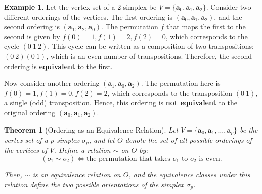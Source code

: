 \documentclass[12pt,oneside,reqno]{amsart}
\theoremstyle{plain}
\newtheorem{theorem}{Theorem}[section]
\theoremstyle{definition}
\newtheorem{example}{Example}[section]
\theoremstyle{remark}
\newcommand{\0}{{\textbf{0}}}
\begin{document}
\begin{example}\label{eg:Equivalence of Ordering of Vertices}
Let the vertex set of a 2-simplex be \( V = \{\mathbf{a}_0, \mathbf{a}_1, \mathbf{a}_2\} \). Consider two different orderings of the vertices. The first ordering is \( (\mathbf{a}_0, \mathbf{a}_1, \mathbf{a}_2) \), and the second ordering is \( (\mathbf{a}_1, \mathbf{a}_2, \mathbf{a}_0) \). The permutation \( f \) that maps the first to the second is given by \( f(0) = 1, f(1) = 2, f(2) = 0 \), which corresponds to the cycle \( (0\ 1\ 2) \). This cycle can be written as a composition of two transpositions: \( (0\ 2)(0\ 1) \), which is an even number of transpositions. Therefore, the second ordering is \textbf{equivalent} to the first.

Now consider another ordering \( (\mathbf{a}_1, \mathbf{a}_0, \mathbf{a}_2) \). The permutation here is \( f(0) = 1, f(1) = 0, f(2) = 2 \), which corresponds to the transposition \( (0\ 1) \), a single (odd) transposition. Hence, this ordering is \textbf{not equivalent} to the original ordering \( (\mathbf{a}_0, \mathbf{a}_1, \mathbf{a}_2) \).
\end{example}

\begin{theorem}[Ordering as an Equivalence Relation]\label{t:Ordering as an Equivalence Relation}
Let $V = \{\mathbf{a}_0, \mathbf{a}_1, \ldots, \mathbf{a}_p\}$ be the vertex set of a $p$-simplex $\sigma_p$, and let $O$ denote the set of all possible orderings of the vertices of $V$. Define a relation $\sim$ on $O$ by:
\[
(o_1 \sim o_2) \iff \text{the permutation that takes } o_1 \text{ to } o_2 \text{ is even}.
\]

Then, $\sim$ is an equivalence relation on $O$, and the equivalence classes under this relation define the two possible orientations of the simplex $\sigma_p$.
\end{theorem}
\end{document}
